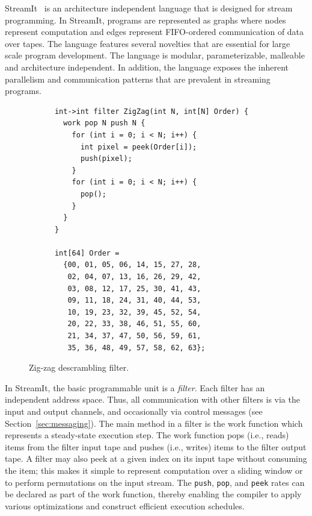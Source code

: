 \label{sec:streamit}

StreamIt~\cite{streamitcc} is an architecture independent language
that is designed for stream programming. In StreamIt, programs are
represented as graphs where nodes represent computation and edges
represent FIFO-ordered communication of data over tapes. The language
features several novelties that are essential for large scale program
development. The language is modular, parameterizable, malleable and
architecture independent. In addition, the language exposes the
inherent parallelism and communication patterns that are prevalent in
streaming programs.

\begin{figure}[t]
  \begin{scriptsize}
	\begin{verbatim}
	  int->int filter ZigZag(int N, int[N] Order) {
	    work pop N push N {
	      for (int i = 0; i < N; i++) {
	        int pixel = peek(Order[i]);
	        push(pixel);
	      }
	      for (int i = 0; i < N; i++) {
	        pop();
	      }
	    }
	  }

	  int[64] Order =
	    {00, 01, 05, 06, 14, 15, 27, 28,
	     02, 04, 07, 13, 16, 26, 29, 42,
	     03, 08, 12, 17, 25, 30, 41, 43,
	     09, 11, 18, 24, 31, 40, 44, 53,
	     10, 19, 23, 32, 39, 45, 52, 54,
	     20, 22, 33, 38, 46, 51, 55, 60,
	     21, 34, 37, 47, 50, 56, 59, 61,
	     35, 36, 48, 49, 57, 58, 62, 63};
	\end{verbatim}
  \end{scriptsize}
  \caption{Zig-zag descrambling filter.}
  \label{fig:zigzag-filter}
\end{figure}

In StreamIt, the basic programmable unit is a {\it filter}.  Each
filter has an independent address space. Thus, all communication with
other filters is via the input and output channels, and occasionally
via control messages (see Section~\ref{sec:messaging}).  The main method
in a filter is the work function which represents a steady-state execution step.
The work function pops (i.e., reads) items from the filter input tape
and pushes (i.e., writes) items to the filter output tape. A filter
may also peek at a given index on its input tape without consuming the
item; this makes it simple to represent computation over a sliding
window or to perform permutations on the input stream. The {\tt push},
{\tt pop}, and {\tt peek} rates can be declared as part of the work
function, thereby enabling the compiler to apply various optimizations
and construct efficient execution schedules.

